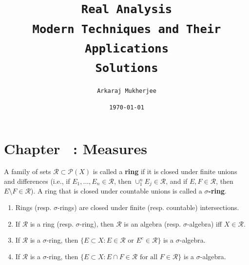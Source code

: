 \documentclass[12pt,a4paper]{article}
\title{\textbf{\texttt{Real Analysis \\ Modern Techniques and Their Applications}} \\ \texttt{Solutions}}
\author{\texttt{Arkaraj Mukherjee}}
\date{\texttt{\today}}
\begin{document}
\maketitle
\newpage
\tableofcontents
\newpage
{}
\section*{Chapter \thesection\ : Measures}
\begin{problem}\label{prob:1-1}
A family of sets $\mathcal{R} \subset \mathcal{P}(X)$ is called a \textbf{ring} if it is closed under finite unions and differences (i.e., if $E_1, \dots, E_n \in \mathcal{R}$, then $\cup_{1}^{n} E_j \in \mathcal{R}$, and if $E, F \in \mathcal{R}$, then $E \setminus F \in \mathcal{R}$). A ring that is closed under countable unions is called a \textbf{$\sigma$-ring}.
\begin{enumerate}[label=\alph*.]
    \item Rings (resp. $\sigma$-rings) are closed under finite (resp. countable) intersections.
    \item If $\mathcal{R}$ is a ring (resp. $\sigma$-ring), then $\mathcal{R}$ is an algebra (resp. $\sigma$-algebra) iff $X \in \mathcal{R}$.
    \item If $\mathcal{R}$ is a $\sigma$-ring, then $\{E \subset X : E \in \mathcal{R} \text{ or } E^c \in \mathcal{R}\}$ is a $\sigma$-algebra.
    \item If $\mathcal{R}$ is a $\sigma$-ring, then $\{E \subset X : E \cap F \in \mathcal{R} \text{ for all } F \in \mathcal{R}\}$ is a $\sigma$-algebra.
\end{enumerate}
\end{problem}
\end{document}

